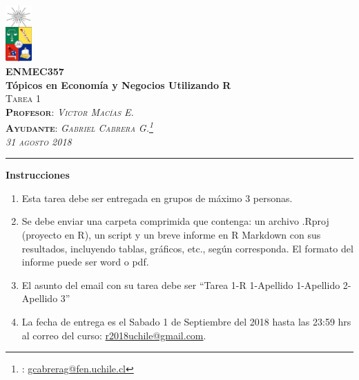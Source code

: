\documentclass[11pt,]{article}
\title{}
\author{}
\date{}
\providecommand{\tightlist}{%
  \setlength{\itemsep}{0pt}\setlength{\parskip}{0pt}}
\let\rmarkdownfootnote\footnote%
\def\footnote{\protect\rmarkdownfootnote}
\begin{document}
\begin{center}
            \includegraphics[width=1cm]{logo.jpg}\\
            \large{\textbf{ENMEC357}}\\
            \LARGE{\textbf{Tópicos en Economía y Negocios Utilizando R}}\\
            \textsc{Tarea 1}\\
            \smallskip
            \small{ \noindent \textsc{\textbf{Profesor}: \textit{Victor Macías E.}}}
            \\
            \small{ \noindent \textsc{\textbf{Ayudante}: \textit{Gabriel Cabrera G.\footnote{ \faSend: \href{mailto:gcabrerag@fen.uchile.cl}{gcabrerag@fen.uchile.cl}}}}} 
            \\
            \textsc{\textit{31 agosto 2018}}    
\end{center}

\vspace{-0.25cm}

\noindent\rule{\textwidth}{0.5pt}

\vspace{-5pt}

\begin{center}
\textbf{Instrucciones}
\end{center}

\begin{enumerate}
\def\labelenumi{\arabic{enumi}.}
\tightlist
\item
  Esta tarea debe ser entregada en grupos de máximo 3 personas.
\item
  Se debe enviar una carpeta comprimida que contenga: un archivo .Rproj
  (proyecto en R), un script y un breve informe en R Markdown con sus
  resultados, incluyendo tablas, gráficos, etc., según corresponda. El
  formato del informe puede ser word o pdf.
\item
  El asunto del email con su tarea debe ser ``Tarea 1-R 1-Apellido
  1-Apellido 2-Apellido 3''
\item
  La fecha de entrega es el Sabado 1 de Septiembre del 2018 hasta las
  23:59 hrs al correo del curso:
  \href{mailto:r2018uchile@gmail.com}{r2018uchile@gmail.com}.
\end{enumerate}
\end{document}
